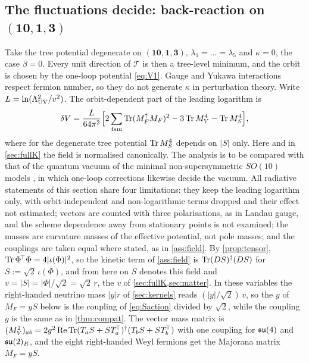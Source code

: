 \subsection{The fluctuations decide: back-reaction on \texorpdfstring{$(\mathbf{10},\mathbf1,\mathbf3)$}{(10,1,3)}}

Take the tree potential degenerate on $(\mathbf{10},\mathbf1,\mathbf3)$, $\lambda_1=\dots=\lambda_5$ and $\kappa=0$, the case $\beta=0$. Every unit direction of $\mathcal T$ is then a
tree-level minimum, and the orbit is chosen by the one-loop potential \eqref{eq:V1}. Gauge and Yukawa interactions respect fermion number, so they do not
generate $\kappa$ in perturbation theory. Write $L=\ln(\Lambda_{\rm UV}^2/v^2)$. The orbit-dependent part of the leading logarithm is
\[
\delta V=\frac L{64\pi^2}\Bigl[2\sum_{\rm fam}\operatorname{Tr}(M_F^\dagger M_F)^2-3\operatorname{Tr} M_V^4-\operatorname{Tr} M_S^4\Bigr],
\]
where for the degenerate tree potential $\operatorname{Tr} M_S^4$ depends on $|S|$ only. Here and in \cref{sec:fullK} the field is normalised canonically. The analysis is
to be compared with that of the quantum vacuum of the minimal non-supersymmetric $SO(10)$ models \cite{BertoliniDiLuzioMalinsky10,BertoliniDiLuzioMalinsky12},
in which one-loop corrections likewise decide the vacuum. All radiative statements
of this section share four limitations: they keep the leading logarithm only, with orbit-independent and non-logarithmic terms dropped and their effect not
estimated; vectors are counted with three polarisations, as in Landau gauge, and the scheme dependence away from stationary points is not examined; the
masses are curvature masses of the effective potential, not pole masses; and the couplings are taken equal where stated, as in \cref{ass:field}. By
\cref{prop:tensor}, $\operatorname{Tr}\Phi^{\!\top}\Phi=4|\iota(\Phi)|^2$, so the kinetic term of \cref{ass:field} is $\operatorname{Tr}(DS)^\dagger(DS)$ for $S:=\sqrt2\,\iota(\Phi)$, and from
here on $S$ denotes this field and $v=|S|=|\Phi|/\sqrt2=\sqrt2\,r$, the $v$ of \cref{sec:fullK,sec:matter}. In these variables the right-handed neutrino mass
$|y|r$ of \cref{sec:kernels} reads $(|y|/\sqrt2)\,v$, so the $y$ of $M_F=yS$ below is the coupling of \eqref{eq:Saction} divided by $\sqrt2$, while the
coupling $g$ is the same as in \cref{thm:compat}. The vector mass matrix is $(M_V^2)_{ab}=2g^2\operatorname{Re}\operatorname{Tr}(T_aS+ST_a^{\!\top})^\dagger(T_bS+ST_b^{\!\top})$
with one coupling for $\mathfrak{su}(4)$ and $\mathfrak{su}(2)_R$, and the eight right-handed Weyl fermions get the Majorana matrix $M_F=yS$.

